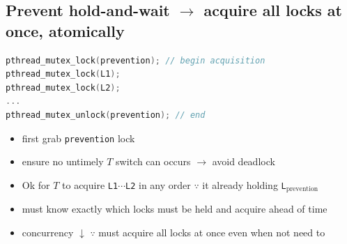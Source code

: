 \documentclass[8pt,a4paper,landscape]{extarticle}
\begin{document}
\begin{multicols*}{3}
\section*{Prevent hold-and-wait $\to$ acquire all locks at once, atomically}
\begin{minipage}{0.75\linewidth}
\begin{lstlisting}[language=c,xleftmargin=2pt]
pthread_mutex_lock(prevention); // begin acquisition
pthread_mutex_lock(L1);
pthread_mutex_lock(L2);
...
pthread_mutex_unlock(prevention); // end
\end{lstlisting}
\end{minipage}
\begin{minipage}{0.3\linewidth}
  \flushleft
  \begin{itemize}
  \item {} first grab \texttt{prevention} lock
  \item ensure no untimely $T$ switch can occurs $\to$ avoid deadlock
  \end{itemize}
\end{minipage}
\begin{itemize}
\item Ok for $T$ to acquire \texttt{L1}$\cdots$\texttt{L2} in any order $\because$ it already holding \texttt{L}$_\text{prevention}$
\item must know exactly which locks must be held and acquire ahead of time
\item concurrency $\downarrow$ $\because$ must acquire all locks at once even when not need to
\end{itemize}
\begin{minipage}{0.56\linewidth}

\end{minipage}
\end{multicols*}
\end{document}
